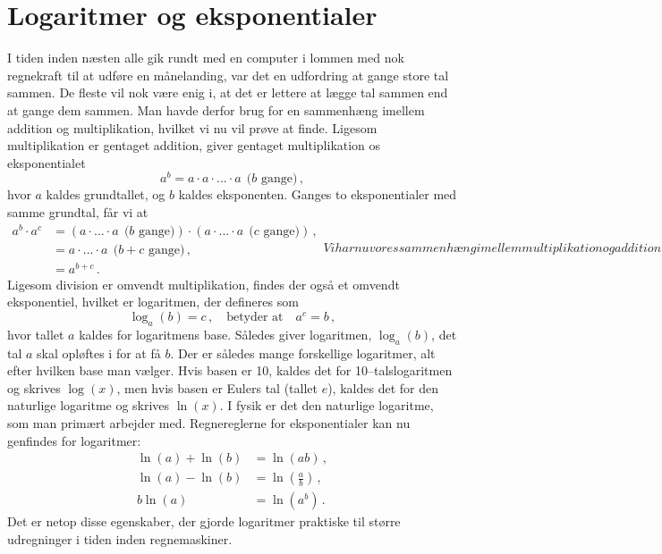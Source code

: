 \section{Logaritmer og eksponentialer}
I tiden inden næsten alle gik rundt med en computer i lommen med nok regnekraft til at udføre en månelanding, var det en udfordring at gange store tal sammen.
De fleste vil nok være enig i, at det er lettere at lægge tal sammen end at gange dem sammen. Man havde derfor brug for en sammenhæng imellem addition og multiplikation, hvilket vi nu vil prøve at finde.
Ligesom multiplikation er gentaget addition, giver gentaget multiplikation os eksponentialet
$$
a^b=a\cdot a\cdot ...\cdot a~~\text{($b$ gange)} \, ,
$$
hvor $a$ kaldes grundtallet, og $b$ kaldes eksponenten. Ganges to eksponentialer med samme grundtal, får vi at
\begin{subequations}
\begin{align}
   a^b\cdot a^c&=(a\cdot ...\cdot a~~\text{($b$ gange)})\cdot(a\cdot ...\cdot a~~\text{($c$ gange)})\nonumber \, ,\\
   &=a\cdot ...\cdot a~~\text{($b+c$ gange)}\nonumber \, ,\\
   &=a^{b+c} \,  .
\end{align}
Vi har nu vores sammenhæng imellem multiplikation og addition, men inden vi fortsætter, bemærker vi to eksponentialregneregler:
\begin{align}
    \frac{a^b}{a^c}&=a^{b-c} \, ,\\
    \left(a^b\right)^c&=a^{bc} \, .
\end{align}
\end{subequations}
Ligesom division er omvendt multiplikation, findes der også et omvendt eksponentiel, hvilket er logaritmen, der defineres som
\begin{equation}
\log_a(b)=c \, ,  \quad \text{betyder at} \quad a^c = b \, ,
\end{equation}
hvor tallet $a$ kaldes for logaritmens base. Således giver logaritmen, $\log_a(b)$, det tal $a$ skal opløftes i for at få $b$. Der er således mange forskellige logaritmer, alt efter hvilken base man vælger. Hvis basen er 10, kaldes det for 10--talslogaritmen og skrives $\log(x)$, men hvis basen er Eulers tal (tallet $e$), kaldes det for den naturlige logaritme og skrives $\ln(x)$. I fysik er det den naturlige logaritme, som man primært arbejder med.  
Regnereglerne for eksponentialer kan nu genfindes for logaritmer:
\begin{subequations}
\label{mat:log}
\begin{align}
    \ln(a)+\ln(b)&=\ln(ab) \, ,\label{mat:log:plus}\\
    \ln(a)-\ln(b)&=\ln(\frac{a}{b})\,,\label{mat:log:minus}\\
    b\ln(a)&=\ln(a^b)\, .\label{mat:log:gange}
\end{align}
\end{subequations}
Det er netop disse egenskaber, der gjorde logaritmer praktiske til større udregninger i tiden inden regnemaskiner.

